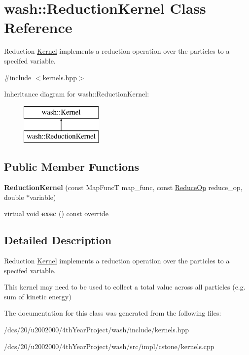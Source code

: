 \hypertarget{classwash_1_1ReductionKernel}{}\section{wash\+:\+:Reduction\+Kernel Class Reference}
\label{classwash_1_1ReductionKernel}


Reduction \mbox{\hyperlink{classwash_1_1Kernel}{Kernel}} implements a reduction operation over the particles to a specifed variable.  




{\ttfamily \#include $<$kernels.\+hpp$>$}

Inheritance diagram for wash\+:\+:Reduction\+Kernel\+:\begin{figure}[H]
\begin{center}
\leavevmode
\includegraphics[height=2.000000cm]{classwash_1_1ReductionKernel}
\end{center}
\end{figure}
\subsection*{Public Member Functions}
\begin{DoxyCompactItemize}
\item 
\mbox{\label{classwash_1_1ReductionKernel_a107edb65b63afdbc530718b5d3e901d6}} 
{\bfseries Reduction\+Kernel} (const Map\+FuncT map\+\_\+func, const \mbox{\hyperlink{namespacewash_a9c59e8c142d63d8640921c1b1957807e}{Reduce\+Op}} reduce\+\_\+op, double $\ast$variable)
\item 
\mbox{\label{classwash_1_1ReductionKernel_a3ead90df8748700f40b2e6820e8e7e91}} 
virtual void {\bfseries exec} () const override
\end{DoxyCompactItemize}


\subsection{Detailed Description}
Reduction \mbox{\hyperlink{classwash_1_1Kernel}{Kernel}} implements a reduction operation over the particles to a specifed variable. 

This kernel may need to be used to collect a total value across all particles (e.\+g. sum of kinetic energy) 

The documentation for this class was generated from the following files\+:\begin{DoxyCompactItemize}
\item 
/dcs/20/u2002000/4th\+Year\+Project/wash/include/kernels.\+hpp\item 
/dcs/20/u2002000/4th\+Year\+Project/wash/src/impl/cstone/kernels.\+cpp\end{DoxyCompactItemize}
